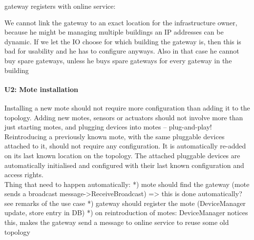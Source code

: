         gateway registers with online service:

            We cannot link the gateway to an exact location for the infrastructure owner, because he might be managing multiple buildings
            an IP addresses can be dynamic. If we let the IO choose for which building the gateway is, then this is bad for usability and
            he has to configure anyways. Also in that case he cannot buy spare gateways, unless he buys spare gateways for every gateway in the building


    \paragraph{U2: Mote installation}
        Installing a new mote should not require more configuration than adding it
        to the topology. Adding new motes, sensors or actuators should not involve
        more than just starting motes, and plugging devices into motes – plug-and-play!
        Reintroducing a previously known mote, with the same pluggable devices attached to it,
        should not require any configuration. It is automatically re-added on
        its last known location on the topology. The attached pluggable devices
        are automatically initialised and configured with their last known
        configuration and access rights. \\
        Thing that need to happen automatically:
        *) mote should find the gateway (mote sends a broadcast message->ReceiveBroadcast) => this is done automatically? see remarks of the use case
        *) gateway should register the mote (DeviceManager update, store entry in DB)
        *) on reintroduction of motes: DeviceManager notices this, makes the gateway send a message to online service to reuse some old topology

